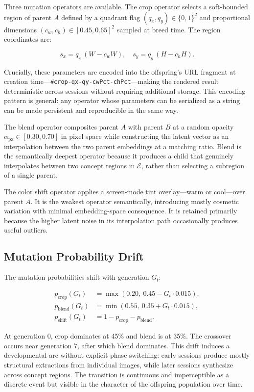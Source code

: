 \documentclass[12pt, a4paper]{article}
\theoremstyle{definition}
\begin{document}
Three mutation operators are available. The crop operator selects a soft-bounded region of parent $A$ defined by a quadrant flag $(q_x, q_y) \in \{0,1\}^2$ and proportional dimensions $(c_w, c_h) \in [0.45, 0.65]^2$ sampled at breed time. The region coordinates are:

\begin{equation}
s_x = q_x\,(W - c_w W),\quad s_y = q_y\,(H - c_h H).
\end{equation}

Crucially, these parameters are encoded into the offspring's URL fragment at creation time---\texttt{\#crop-qx-qy-cwPct-chPct}---making the rendered result deterministic across sessions without requiring additional storage. This encoding pattern is general: any operator whose parameters can be serialized as a string can be made persistent and reproducible in the same way.

The blend operator composites parent $A$ with parent $B$ at a random opacity $\alpha_{\mathrm{px}} \in [0.30, 0.70]$ in pixel space while constructing the latent vector as an interpolation between the two parent embeddings at a matching ratio. Blend is the semantically deepest operator because it produces a child that genuinely interpolates between two concept regions in $\mathcal{E}$, rather than selecting a subregion of a single parent.

The color shift operator applies a screen-mode tint overlay---warm or cool---over parent $A$. It is the weakest operator semantically, introducing mostly cosmetic variation with minimal embedding-space consequence. It is retained primarily because the higher latent noise in its interpolation path occasionally produces useful outliers.

\subsection{Mutation Probability Drift}

The mutation probabilities shift with generation $G_t$:

\begin{align}
p_{\mathrm{crop}}(G_t)  &= \max(0.20,\ 0.45 - G_t \cdot 0.015), \\
p_{\mathrm{blend}}(G_t) &= \min(0.55,\ 0.35 + G_t \cdot 0.015), \\
p_{\mathrm{shift}}(G_t) &= 1 - p_{\mathrm{crop}} - p_{\mathrm{blend}}.
\end{align}

At generation 0, crop dominates at 45\% and blend is at 35\%. The crossover occurs near generation 7, after which blend dominates. This drift induces a developmental arc without explicit phase switching: early sessions produce mostly structural extractions from individual images, while later sessions synthesize across concept regions. The transition is continuous and imperceptible as a discrete event but visible in the character of the offspring population over time.
\end{document}
